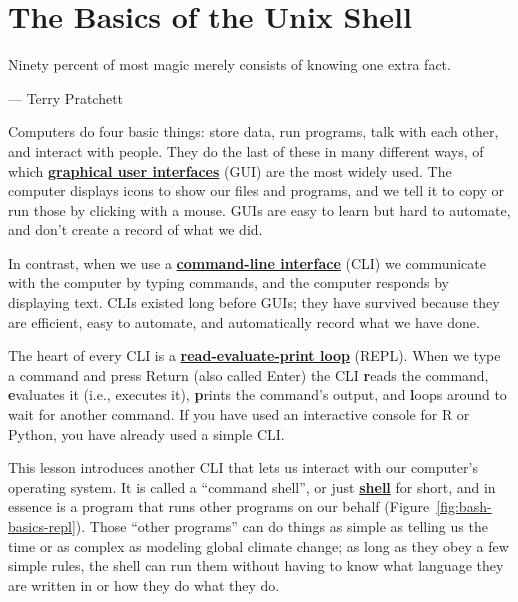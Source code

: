 \documentclass[
]{krantz}
\renewenvironment{quote}{\begin{VF}}{\end{VF}}
\newcommand{\gref}[2]{\hyperlink{#2}{\textbf{#1}}}
\begin{document}
\hypertarget{bash-basics}{%
\chapter{The Basics of the Unix Shell}\label{bash-basics}}

\begin{quote}
Ninety percent of most magic merely consists of knowing one extra fact.

--- Terry Pratchett
\end{quote}

Computers do four basic things:
store data,
run programs,
talk with each other,
and interact with people.
They do the last of these in many different ways,
of which \gref{graphical user interfaces}{gui} (GUI) are the most widely used.
The computer displays icons to show our files and programs,
and we tell it to copy or run those by clicking with a mouse.
GUIs are easy to learn but hard to automate,
and don't create a record of what we did.

In contrast,
when we use a \gref{command-line interface}{cli} (CLI)
we communicate with the computer by typing commands,
and the computer responds by displaying text.
CLIs existed long before GUIs;
they have survived because they are efficient,
easy to automate,
and automatically record what we have done.

The heart of every CLI is a \gref{read-evaluate-print loop}{repl} (REPL).
When we type a command and press Return (also called Enter)
the CLI \textbf{r}eads the command,
\textbf{e}valuates it (i.e., executes it),
\textbf{p}rints the command's output,
and \textbf{l}oops around to wait for another command.
If you have used an interactive console for R or Python,
you have already used a simple CLI.

This lesson introduces another CLI that lets us interact with our computer's operating system.
It is called a ``command shell'',
or just \gref{shell}{shell} for short,
and in essence is a program that runs other programs on our behalf
(Figure~\ref{fig:bash-basics-repl}).
Those ``other programs'' can do things as simple as telling us the time
or as complex as modeling global climate change;
as long as they obey a few simple rules,
the shell can run them without having to know what language they are written in
or how they do what they do.
\end{document}
